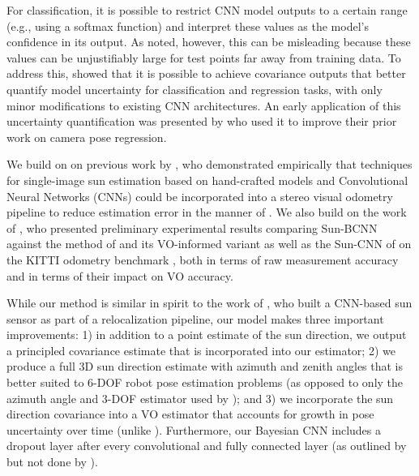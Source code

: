 For classification, it is possible to restrict CNN model outputs to a certain range (e.g., using a softmax function) and interpret these values as the model's confidence in its output. As \citet{Gal2016UncertaintyThesis} noted, however, this can be misleading because these  values can be unjustifiably large for test points far away from training data.  To address this, \citet{Gal2016-ny} showed that it is possible to achieve covariance outputs that better quantify model uncertainty for classification and regression tasks, with only minor modifications to existing CNN architectures. 
An early application of this uncertainty quantification was presented by \citet{Kendall2016-zf} who used it to improve their prior work \citep{Kendall2015-ew} on camera pose regression.

We build on on previous work by \citet{2017_Clement_Improving}, who demonstrated empirically that techniques for single-image sun estimation based on hand-crafted models \citep{Lalonde2011-jw} and Convolutional Neural Networks (CNNs) \citep{Ma2016-at} could be incorporated into a stereo visual odometry pipeline to reduce estimation error in the manner of \citet{Lambert2012-sn}.
We also build on the work of \citet{2017_Peretroukhin_Reducing}, who presented preliminary experimental results comparing Sun-BCNN against the method of \citet{Lalonde2011-jw} and its VO-informed variant \citep{2017_Clement_Improving} as well as the Sun-CNN of \citet{Ma2016-at} on the KITTI odometry benchmark \citep{Geiger2013-ky}, both in terms of raw measurement accuracy and in terms of their impact on VO accuracy.

While our method is similar in spirit to the work of \citet{Ma2016-at}, who built a CNN-based sun sensor as part of a relocalization pipeline, our model makes three important improvements: 1) in addition to a point estimate of the sun direction, we output a principled covariance estimate that is incorporated into our estimator; 2) we produce a full 3D sun direction estimate with azimuth and zenith angles that is better suited to 6-DOF robot pose estimation problems (as opposed to only the azimuth angle and 3-DOF estimator used by \citet{Ma2016-at}); and 3) we incorporate the sun direction covariance into a VO estimator that accounts for growth in pose uncertainty over time (unlike \citet{2017_Clement_Improving}). 
Furthermore, our Bayesian CNN includes a dropout layer after every convolutional and fully connected layer (as outlined by \citet{Gal2016-ny} but not done by \citet{Kendall2016-zf}).

